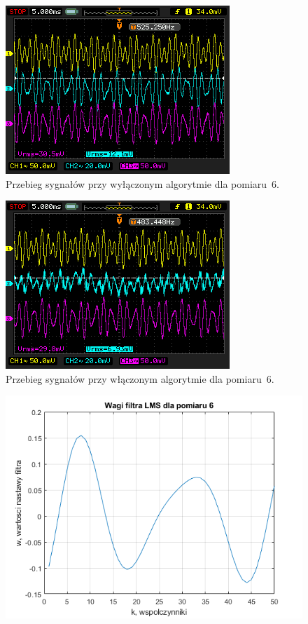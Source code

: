 \begin{enumerate}
\begin{figure}[h!]
		\includegraphics[scale=0.7]{../Assets/Results/6_complex_off.png}
		\caption{Przebieg sygnałów przy wyłączonym algorytmie dla pomiaru~6.}
		\label{fig:test_6_off}
	\end{figure}	
	\begin{figure}[h!]
		\centering
		\includegraphics[scale=0.7]{../Assets/Results/6_complex_on.png}
		\caption{Przebieg sygnałów przy włączonym algorytmie dla pomiaru~6.}
		\label{fig:test_6_on}
	\end{figure}
	\begin{figure}[h!]
		\centering
		\includegraphics[scale=0.7]{../Assets/Results/6_wagi_lms.png}

\end{figure}
\end{enumerate}
